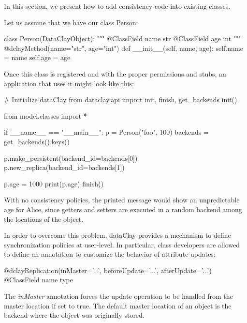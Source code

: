 In this section, we present how to add consistency code into existing classes.

Let us assume that we have our class Person:

\begin{tBox}
\begin{python}
class Person(DataClayObject):
     """
     @ClassField name str
     @ClassField age int
     """
    @dclayMethod(name="str", age="int")
    def __init__(self, name, age):
        self.name = name
        self.age = age
\end{python}
\end{tBox}

Once this class is registered and with the proper permissions and stubs, an application that uses it might look like this:

\begin{tBox}
\begin{python}
# Initialize dataClay
from dataclay.api import init, finish, get_backends
init()

from model.classes import *

if __name__ == "__main__":
    p = Person("foo", 100)
    backends = get_backends().keys()
    
    p.make_persistent(backend_id=backends[0])
    p.new_replica(backend_id=backends[1])    
    
    p.age = 1000
    print(p.age)    
    finish()
\end{python}
\end{tBox}

With no consistency policies, the printed message would show an unpredictable age for Alice, since getters and setters are executed in a random backend among the locations of the object.

In order to overcome this problem, dataClay provides a mechanism to define synchronization policies at user-level. In particular, class developers are allowed to define an annotation to customize the behavior of attribute updates:

\begin{tBox}
\begin{python}
@dclayReplication(inMaster='...', beforeUpdate='...', afterUpdate='...')
@ClassField name type
\end{python}
\end{tBox}

The \textit{inMaster} annotation forces the update operation to be handled from the master location if set to true. The default master location of an object is the backend where the object was originally stored.

